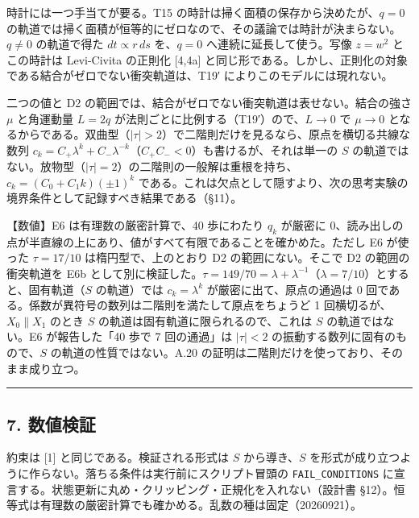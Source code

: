 \documentclass[
  a4paper,
]{ltjsarticle}
\begin{document}
時計には一つ手当てが要る。T15
の時計は掃く面積の保存から決めたが、\(q=0\)
の軌道では掃く面積が恒等的にゼロなので、その議論では時計が決まらない。\(q\neq0\)
の軌道で得た \(dt\propto r\,ds\) を、\(q=0\) へ連続に延長して使う。写像
\(z=w^2\) とこの時計は Levi-Civita の正則化 {[}4,4a{]}
と同じ形である。しかし、正則化の対象である結合がゼロでない衝突軌道は、T19′
によりこのモデルには現れない。

二つの値と D2 の範囲では、結合がゼロでない衝突軌道は表せない。結合の強さ
\(\mu\) と角運動量 \(L=2q\) が法則ごとに比例する（T19′）ので、\(L\to0\)
で \(\mu\to0\)
となるからである。双曲型（\(\lvert\tau\rvert>2\)）で二階則だけを見るなら、原点を横切る共線な数列
\(c_k=C_+\lambda^k+C_-\lambda^{-k}\)（\(C_+C_-<0\)）も書けるが、それは単一の
\(S\)
の軌道ではない。放物型（\(\lvert\tau\rvert=2\)）の二階則の一般解は重根を持ち、\(c_k=(C_0+C_1k)(\pm1)^k\)
である。これは欠点として隠すより、次の思考実験の境界条件として記録すべき結果である（§11）。

【数値】E6 は有理数の厳密計算で、40 歩にわたり \(q_k\) が厳密に
0、読み出しの点が半直線の上にあり、値がすべて有限であることを確かめた。ただし
E6 が使った \(\tau=17/10\) は楕円型で、上のとおり D2
の範囲にない。そこで D2 の範囲の衝突軌道を E6b
として別に検証した。\(\tau=149/70=\lambda+\lambda^{-1}\)（\(\lambda=7/10\)）とすると、固有軌道（\(S\)
の軌道）では \(c_k=\lambda^k\) が厳密に出て、原点の通過は 0
回である。係数が異符号の数列は二階則を満たして原点をちょうど 1
回横切るが、\(X_0\parallel X_1\) のとき \(S\)
の軌道は固有軌道に限られるので、これは \(S\) の軌道ではない。E6
が報告した「40 歩で 7 回の通過」は \(\lvert\tau\rvert<2\)
の振動する数列に固有のもので、\(S\) の軌道の性質ではない。A.20
の証明は二階則だけを使っており、そのまま成り立つ。

\begin{center}\rule{0.5\linewidth}{0.5pt}\end{center}

\subsection{7. 数値検証}\label{ux6570ux5024ux691cux8a3c}

約束は {[}1{]} と同じである。検証される形式は \(S\) から導き、\(S\)
を形式が成り立つように作らない。落ちる条件は実行前にスクリプト冒頭の
\texttt{FAIL\_CONDITIONS}
に宣言する。状態更新に丸め・クリッピング・正規化を入れない（設計書
§12）。恒等式は有理数の厳密計算でも確かめる。乱数の種は固定（20260921）。
\end{document}
